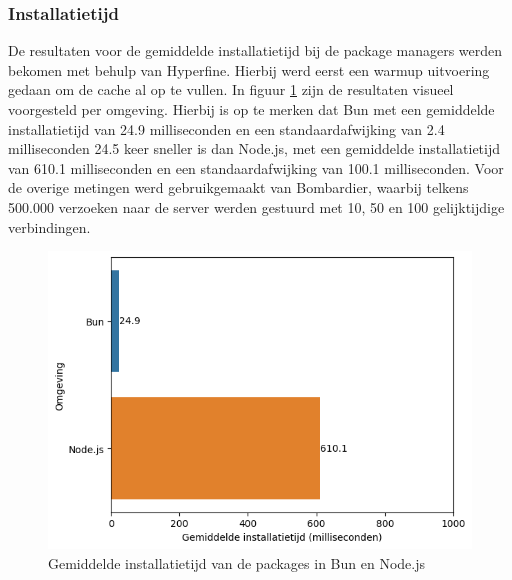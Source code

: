\subsubsection{Installatietijd}
De resultaten voor de gemiddelde installatietijd bij de package managers werden bekomen met behulp van Hyperfine.
Hierbij werd eerst een warmup uitvoering gedaan om de cache al op te vullen.
In figuur \ref{fig:installatietijdapp} zijn de resultaten visueel voorgesteld per omgeving.
Hierbij is op te merken dat Bun met een gemiddelde installatietijd van 24.9 milliseconden en een standaardafwijking van 2.4 milliseconden 24.5 keer sneller 
is dan Node.js, met een gemiddelde installatietijd van 610.1 milliseconden en een standaardafwijking van 100.1 milliseconden.
Voor de overige metingen werd gebruikgemaakt van Bombardier, waarbij
telkens 500.000 verzoeken naar de server werden gestuurd met 10, 50 en 100 gelijktijdige verbindingen.
\begin{figure}[H]
  \centering
  \includegraphics{graphics/install.png}
  \caption[Gemiddelde Installatietijd]{\label{fig:installatietijdapp}Gemiddelde installatietijd van de packages in Bun en Node.js}
\end{figure}



